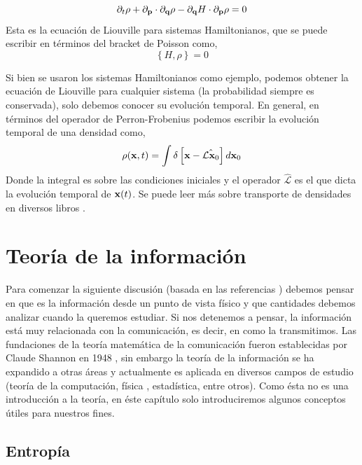 \documentclass[executivepaper,12pt]{article}
\numberwithin{equation}{section}
\begin{document}
\begin{equation*}
	\partial_t \rho +\partial_{\vb{p}}\cdot \partial_{\vb{q}}\rho -\partial_{\vb{q}}H\cdot\partial_{\vb{p}}\rho=0
\end{equation*}
Esta es la ecuación de Liouville para sistemas Hamiltonianos, que se puede escribir en términos del bracket de Poisson como,
\begin{equation*}
	\left\{H,\rho\right\}=0
\end{equation*}

Si bien se usaron los sistemas Hamiltonianos como ejemplo, podemos obtener la ecuación de Liouville para cualquier sistema (la probabilidad siempre es conservada), solo debemos conocer su evolución temporal. En general, en términos del operador de Perron-Frobenius podemos escribir la evolución temporal de una densidad como,
\begin{equation*}
	\rho(\vb{x},t)=\int \delta\left[\vb{x}-\hat{\mathcal{L}\vb{x}_0}\right] d\vb{x}_0
\end{equation*}
Donde la integral es sobre las condiciones iniciales y el operador $\hat{\mathcal{L}}$ es el que dicta la evolución temporal de $\vb{x}(t)$. Se puede leer más sobre transporte de densidades en diversos libros \parencite{cvitanovic2005,lasota2013,gaspard2005,beck1995}.
	
\pagebreak
\section{Teoría de la información}

Para comenzar la siguiente discusión (basada en las referencias \parencite{nicolis2012,beck2009,cover1999}) debemos pensar en que es la información desde un punto de vista físico y que cantidades debemos analizar cuando la queremos estudiar. Si nos detenemos a pensar, la información está muy relacionada con la comunicación, es decir, en como la transmitimos. Las fundaciones de la teoría matemática de la comunicación fueron establecidas por Claude Shannon en 1948 \parencite{shannon1948}, sin embargo la teoría de la información se ha expandido a otras áreas y actualmente es aplicada en diversos campos de estudio (teoría de la computación, física \parencite{jaynes1957}, estadística, entre otros). Como ésta no es una introducción a la teoría, en éste capítulo solo introduciremos algunos conceptos útiles para nuestros fines. 

        
\subsection{Entropía}
\end{document}
